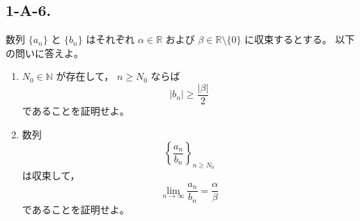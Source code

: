 \subsection{1-A-6.}
\begin{exercise}
	数列 $\{a_n\}$ と $\{b_n\}$ はそれぞれ
	$\alpha\in\mathbb{R}$ および
	$\beta\in\mathbb{R}\setminus\{0\}$ に収束するとする。
	以下の問いに答えよ。

	\begin{enumerate}
		\item $N_0\in\mathbb{N}$ が存在して，
		$n\geq N_0$ ならば
		\[
			|b_n|\geq \frac{|\beta|}{2}
		\]
		であることを証明せよ。

		\item 数列
		\[
			\left\{\frac{a_n}{b_n}\right\}_{n\geq N_0}
		\]
		は収束して，
		\[
			\lim_{n\to\infty}\frac{a_n}{b_n}
			=
			\frac{\alpha}{\beta}
		\]
		であることを証明せよ。
	\end{enumerate}
\end{exercise}

